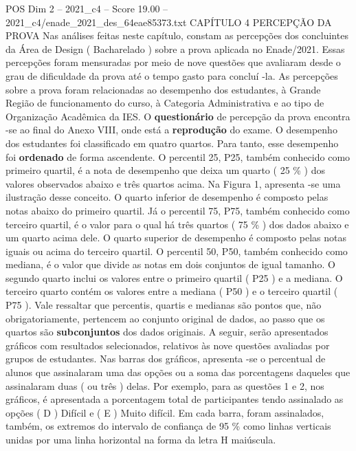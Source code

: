 \begin{textsample}{POS Dim 2 – 2021\_c4 – Score 19.00 – 2021\_c4/enade\_2021\_des\_64eae85373.txt}  \label{ex:f2_pos_038}
CAPÍTULO 4 PERCEPÇÃO DA PROVA Nas análises feitas neste capítulo, constam as percepções dos concluintes da Área de Design ( Bacharelado ) sobre a prova aplicada no Enade/2021.
Essas percepções foram mensuradas por meio de nove questões que avaliaram desde o grau de dificuldade da prova até o tempo gasto para concluí -la.
As percepções sobre a prova foram relacionadas ao desempenho dos estudantes, à Grande Região de funcionamento do curso, à Categoria Administrativa e ao tipo de Organização Acadêmica da IES.
O \textbf{questionário} de percepção da prova encontra -se ao final do Anexo VIII, onde está a \textbf{reprodução} do exame.
O desempenho dos estudantes foi classificado em quatro quartos.
Para tanto, esse desempenho foi \textbf{ordenado} de forma ascendente.
O percentil 25, P25, também conhecido como primeiro quartil, é a nota de desempenho que deixa um quarto ( 25 \% ) dos valores observados abaixo e três quartos acima.
Na Figura 1, apresenta -se uma ilustração desse conceito.
O quarto inferior de desempenho é composto pelas notas abaixo do primeiro quartil.
Já o percentil 75, P75, também conhecido como terceiro quartil, é o valor para o qual há três quartos ( 75 \% ) dos dados abaixo e um quarto acima dele.
O quarto superior de desempenho é composto pelas notas iguais ou acima do terceiro quartil.
O percentil 50, P50, também conhecido como mediana, é o valor que divide as notas em dois conjuntos de igual tamanho.
O segundo quarto inclui os valores entre o primeiro quartil ( P25 ) e a mediana.
O terceiro quarto contém os valores entre a mediana ( P50 ) e o terceiro quartil ( P75 ).
Vale ressaltar que percentis, quartis e medianas são pontos que, não obrigatoriamente, pertencem ao conjunto original de dados, ao passo que os quartos são \textbf{subconjuntos} dos dados originais.
A seguir, serão apresentados gráficos com resultados selecionados, relativos às nove questões avaliadas por grupos de estudantes.
Nas barras dos gráficos, apresenta -se o percentual de alunos que assinalaram uma das opções ou a soma das porcentagens daqueles que assinalaram duas ( ou três ) delas.
Por exemplo, para as questões 1 e 2, nos gráficos, é apresentada a porcentagem total de participantes tendo assinalado as opções ( D ) Difícil e ( E ) Muito difícil.
Em cada barra, foram assinalados, também, os extremos do intervalo de confiança de 95 \% como linhas verticais unidas por uma linha horizontal na forma da letra H maiúscula.

\end{textsample}
